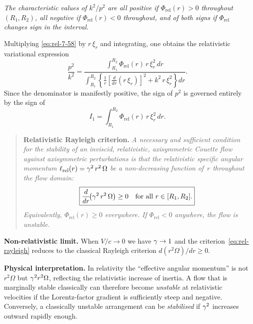 \emph{The characteristic values of $k^{2}\!/p^{2}$ are all positive if
$\Phi_{\mathrm{rel}}(r)>0$ throughout $(R_1,R_2)$, all negative if
$\Phi_{\mathrm{rel}}(r)<0$ throughout, and of both signs if
$\Phi_{\mathrm{rel}}$ changes sign in the interval.}

Multiplying \eqref{eq:rel-7-58} by $r\,\xi_r$ and integrating, one
obtains the relativistic variational expression
\begin{equation}
\label{eq:rel-7-60}
\frac{p^{2}}{k^{2}}
= \frac{\displaystyle\int_{R_1}^{R_2}
    \Phi_{\mathrm{rel}}(r)\,r\,\xi_r^{2}\,dr}
  {\displaystyle\int_{R_1}^{R_2}\!\left\{
    \frac{1}{r}\!\left[\frac{d}{dr}(r\,\xi_r)\right]^{2}
    + k^{2}\,r\,\xi_r^{2}\right\}dr}.
\end{equation}
Since the denominator is manifestly positive, the sign of $p^{2}$ is
governed entirely by the sign of
\begin{equation}
\label{eq:rel-7-61}
I_1 = \int_{R_1}^{R_2}
  \Phi_{\mathrm{rel}}(r)\,r\,\xi_r^{2}\,dr.
\end{equation}

\begin{quote}
\textbf{Relativistic Rayleigh criterion.}\quad
\emph{A necessary and sufficient condition for the stability of an
inviscid, relativistic, axisymmetric Couette flow against
axisymmetric perturbations is that the relativistic specific angular
momentum $\ell_{\mathrm{rel}}(r)=\gamma^{2}\,r^{2}\,\Omega$ be a
non-decreasing function of~$r$ throughout the flow domain:}
\begin{equation}
\label{eq:rel-rayleigh}
\boxed{%
\frac{d}{dr}\!\bigl(\Lf^{2}\,r^{2}\,\Omega\bigr)\ge 0
\quad\text{for all } r\in[R_1,R_2].}
\end{equation}
\emph{Equivalently, $\Phi_{\mathrm{rel}}(r)\ge 0$ everywhere.
If $\Phi_{\mathrm{rel}}<0$ anywhere, the flow is unstable.}
\end{quote}

\noindent\textbf{Non-relativistic limit.}\quad
When $V/c\to0$ we have $\gamma\to1$ and the criterion~\eqref{eq:rel-rayleigh}
reduces to the classical Rayleigh criterion
$d(r^{2}\Omega)/dr\ge0$.

\noindent\textbf{Physical interpretation.}\quad
In relativity the ``effective angular momentum'' is not $r^{2}\Omega$
but $\gamma^{2}r^{2}\Omega$, reflecting the relativistic increase of
inertia.  A flow that is marginally stable classically can therefore
become \emph{unstable} at relativistic velocities if the Lorentz-factor
gradient is sufficiently steep and negative.  Conversely, a classically
unstable arrangement can be \emph{stabilised} if $\gamma^{2}$ increases
outward rapidly enough.

